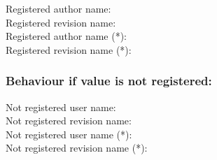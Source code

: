 Registered author name: \svnFullAuthor{\svnfileauthor}\\
Registered revision name: \svnFullRevision{\svnfilerev}\\
Registered author name (*): \svnFullAuthor*{\svnfileauthor}\\
Registered revision name (*): \svnFullRevision*{\svnfilerev}\\

\subsubsection*{Behaviour if value is not registered:}
Not registered user name: \\
Not registered revision name: \\
Not registered user name (*): \\
Not registered revision name (*): \\



